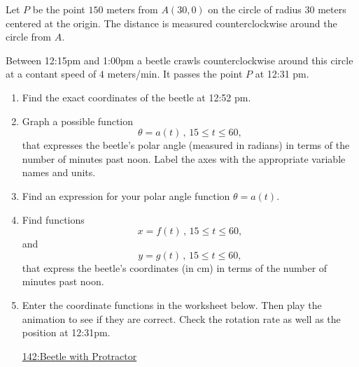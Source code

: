 \documentclass{ximera}
\begin{document}
\begin{question}  \label{QLDFg4tbbfg}
Let $P$ be the point $150$ meters from $A(30,0)$ on the circle of radius $30$ meters centered at the origin. The distance is measured counterclockwise around the circle from $A$.
 
Between 12:15pm and 1:00pm a beetle crawls counterclockwise around this circle at a contant speed of $4$ meters/min. It passes the point $P$ at 12:31 pm.

\begin{enumerate}
\item Find the exact coordinates of the beetle at 12:52 pm.

\item Graph a possible function
\[
 \theta = a(t) \, , \, 15\leq t \leq 60 ,
\]
that expresses the beetle's polar angle (measured in radians) in terms of the number of minutes past noon. Label the axes with the appropriate variable names and units.

\item Find an expression for your polar angle function $\theta = a(t)$.

\item Find functions
\[
     x = f(t) \, , \, 15 \leq t \leq 60,
\]
and
\[
     y = g(t) \, , \, 15 \leq t \leq 60,
\]
that express the beetle's coordinates (in cm) in terms of the number of minutes past noon.

\item Enter the coordinate functions in the worksheet below. Then play the animation to see if they are correct. Check the rotation rate as well as the position at 12:31pm.

\begin{onlineOnly}
    \begin{center}
\end{center}
\end{onlineOnly}

\href{https://www.desmos.com/calculator/hidmxiwubv}{142:Beetle with Protractor}


\end{enumerate}

\end{question}
\end{document}
